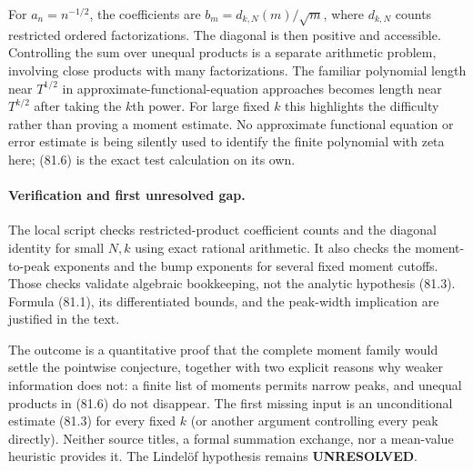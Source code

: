 \documentclass[11pt]{article}
\begin{document}
For $a_n=n^{-1/2}$, the coefficients are
$b_m=d_{k,N}(m)/\sqrt m$, where $d_{k,N}$ counts restricted ordered
factorizations. The diagonal is then positive and accessible. Controlling
the sum over unequal products is a separate arithmetic problem, involving
close products with many factorizations. The familiar polynomial length
near $T^{1/2}$ in approximate-functional-equation approaches becomes
length near $T^{k/2}$ after taking the $k$th power. For large fixed $k$
this highlights the difficulty rather than proving a moment estimate.
No approximate functional equation or error estimate is being silently
used to identify the finite polynomial with zeta here; (81.6) is the
exact test calculation on its own.

\paragraph{Verification and first unresolved gap.}
The local script checks restricted-product coefficient counts and the
diagonal identity for small $N,k$ using exact rational arithmetic. It also
checks the moment-to-peak exponents and the bump exponents for several
fixed moment cutoffs. Those checks validate algebraic bookkeeping, not
the analytic hypothesis (81.3). Formula (81.1), its differentiated bounds,
and the peak-width implication are justified in the text.

The outcome is a quantitative proof that the complete moment family would
settle the pointwise conjecture, together with two explicit reasons why
weaker information does not: a finite list of moments permits narrow
peaks, and unequal products in (81.6) do not disappear. The first missing
input is an unconditional estimate (81.3) for every fixed $k$ (or another
argument controlling every peak directly). Neither source titles, a
formal summation exchange, nor a mean-value heuristic provides it.
The Lindelöf hypothesis remains \textbf{UNRESOLVED}.
\end{document}
